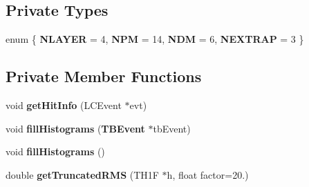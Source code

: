 \subsection*{Private Types}
\begin{DoxyCompactItemize}
\item 
enum \{ {\bfseries NLAYER} = 4, 
{\bfseries NPM} = 14, 
{\bfseries NDM} = 6, 
{\bfseries NEXTRAP} = 3
 \}
\end{DoxyCompactItemize}
\subsection*{Private Member Functions}
\begin{DoxyCompactItemize}
\item 
void {\bfseries getHitInfo} (LCEvent $\ast$evt)\label{classTBTrackScatter_ab1ea6e233c8bb77220d359f12a9c9157}

\item 
void {\bfseries fillHistograms} ({\bf TBEvent} $\ast$tbEvent)\label{classTBTrackScatter_a640bc27626ee6e00e65c38065a2d358a}

\item 
void {\bfseries fillHistograms} ()\label{classTBTrackScatter_ab72d09b02640fe451b58f87989b6b6bc}

\item 
double {\bfseries getTruncatedRMS} (TH1F $\ast$h, float factor=20.)\label{classTBTrackScatter_aece42b823239fe34a46c3497718acb76}

\end{DoxyCompactItemize}
